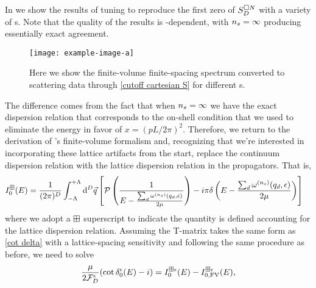In  we show the results of tuning to reproduce the first zero of $S_D^{\square N}$ with a variety of {\nstep}s.
Note that the quality of the results is \nstep-dependent, with ${n_s}=\infty$ producing essentially exact agreement.

\begin{figure}
    \texttt{[image: example-image-a]}
    \caption{Here we show the finite-volume finite-spacing spectrum converted to scattering data through \eqref{cutoff cartesian S} for different {\nstep}s.
    }
    \label{fig:results cutoff cartesian S}
\end{figure}

The difference comes from the fact that when ${n_s}=\infty$ we have the exact dispersion relation that corresponds to the on-shell condition that we used to eliminate the energy in favor of $x=(pL/2\pi)^2$.
Therefore, we return to the derivation of \Luscher's finite-volume formalism and, recognizing that we're interested in incorporating these lattice artifacts from the start, replace the continuum dispersion relation with the lattice dispersion relation in the propagators.
That is,
\begin{align}
    \label{eq:dispersion I0}
    I_0^{\boxplus}(E)
    &=\frac{1}{(2\pi)^D}
    \int_{-\Lambda}^{+\Lambda}
        \mathrm{d}^D \vec{q}
        \left[
            \mathcal{P} \left( \frac { 1 } { E - \frac{\sum_d \omega^{({n_s})}(q_d,\epsilon)}{2\mu} } \right)
            -i \pi \delta\left(E - \frac{\sum_d \omega^{({n_s})}(q_d, \epsilon)}{2\mu}\right)
        \right]
\end{align}
where we adopt a $\boxplus$ superscript to indicate the quantity is defined accounting for the lattice dispersion relation.
Assuming the T-matrix takes the same form as \eqref{cot delta} with a lattice-spacing sensitivity and following the same procedure as before, we need to solve
\begin{equation}
    \frac{\mu}{2\mathcal{F}_D^\epsilon}(\cot \delta_0^\epsilon(E) - i) = I_0^{\boxplus \epsilon}(E) - I_{0,\textrm{FV}}^{\boxplus \epsilon}(E),
\end{equation}
